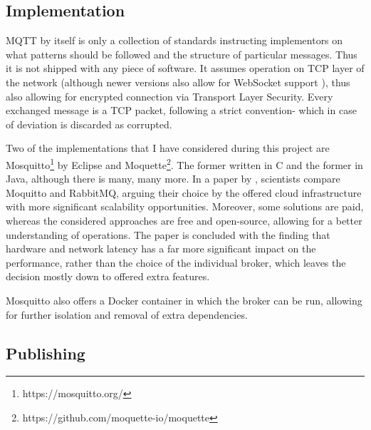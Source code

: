 \subsection{Implementation}
MQTT by itself is only a collection of standards instructing implementors on what patterns should be followed and the structure of particular messages. Thus it is not shipped with any piece of software. It assumes operation on TCP layer of the network (although newer versions also allow for WebSocket support \citep{mijovic2016comparing}), thus also allowing for encrypted connection via Transport Layer Security. Every exchanged message is a TCP packet, following a strict convention- which in case of deviation is discarded as corrupted.

Two of the implementations that I have considered during this project are Mosquitto\footnote{https://mosquitto.org/} by Eclipse and Moquette\footnote{https://github.com/moquette-io/moquette}. The former written in C and the former in Java, although there is many, many more. In a paper by \citet{de2019performance}, scientists compare Moquitto and RabbitMQ, arguing their choice by the offered cloud infrastructure with more significant scalability opportunities. Moreover, some solutions are paid, whereas the considered approaches are free and open-source, allowing for a better understanding of operations. The paper is concluded with the finding that hardware and network latency has a far more significant impact on the performance, rather than the choice of the individual broker, which leaves the decision mostly down to offered extra features.

Mosquitto also offers a Docker container \cite{light2017mosquitto} in which the broker can be run, allowing for further isolation and removal of extra dependencies.

\subsection{Publishing}

